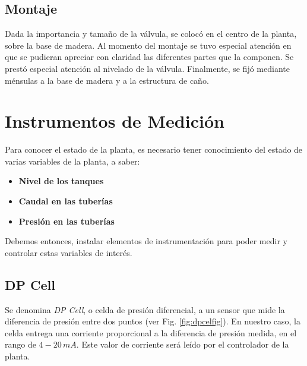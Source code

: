 \subsection{Montaje}
Dada la importancia y tamaño de la válvula, se colocó en el centro de
la planta, sobre la base de madera.
Al momento del montaje se tuvo especial atención en que se pudieran apreciar
con claridad las diferentes partes que la componen.
Se prestó especial atención al nivelado de la válvula.
Finalmente, se fijó mediante ménsulas a la base de madera y a la estructura
de caño.

\section{Instrumentos de Medición}
\label{sec:InstrumentosMedicion}
Para conocer el estado de la planta, es necesario tener conocimiento del
estado de varias variables de la planta, a saber:
\begin{itemize}
 \item \textbf{Nivel de los tanques}
 \item \textbf{Caudal en las tuberías}
 \item \textbf{Presión en las tuberías}
\end{itemize}
Debemos entonces, instalar elementos de instrumentación para poder 
medir y controlar estas variables de interés.

\subsection{DP Cell}
\label{subsec:DPCell}

Se denomina \textit{DP Cell}, o celda de presión diferencial, a un sensor
que mide la diferencia de presión entre dos puntos (ver Fig. \ref{fig:dpcelfig}).
En nuestro caso, la celda entrega una corriente proporcional a la diferencia de
presión medida, en el rango de $4-20\,mA$.
Este valor de corriente será leído por el controlador de la planta.

